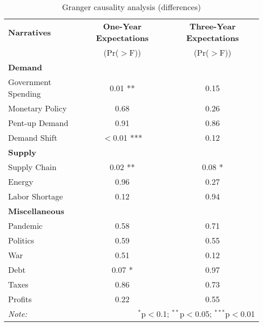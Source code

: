 \begin{table}[ht]
\centering
\caption{Granger causality analysis (differences)}\label{table:granger}

\begin{tabular}{lcc}
\toprule
\textbf{Narratives} & \textbf{One-Year Expectations} & \textbf{Three-Year Expectations} \\
& (Pr($>$F)) & (Pr($>$F)) \\
\midrule
\multicolumn{3}{l}{\textbf{Demand}} \\
\midrule
Government Spending & 0.01 ** & 0.15 \\
Monetary Policy & 0.68 & 0.26 \\
Pent-up Demand & 0.91 & 0.86 \\
Demand Shift & $<$0.01 *** & 0.12 \\
\midrule
\multicolumn{3}{l}{\textbf{Supply}} \\
\midrule
Supply Chain & 0.02 ** & 0.08 * \\
Energy & 0.96 & 0.27 \\
Labor Shortage & 0.12 & 0.94 \\
\midrule
\multicolumn{3}{l}{\textbf{Miscellaneous}} \\
\midrule
Pandemic & 0.58 & 0.71 \\
Politics & 0.59 & 0.55 \\
War & 0.51 & 0.12 \\
Debt & 0.07 * & 0.97 \\
Taxes & 0.86 & 0.73 \\
Profits & 0.22 & 0.55 \\
\midrule
\bottomrule
\textit{Note:}  & \multicolumn{2}{r}{$^{*}$p$<$0.1; $^{**}$p$<$0.05; $^{***}$p$<$0.01} \\
\bottomrule
\end{tabular}
\end{table}
